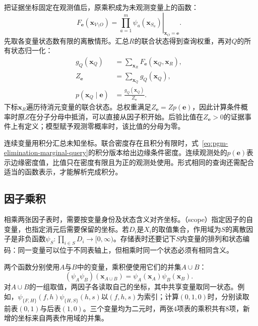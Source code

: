 把证据坐标固定在观测值后，原乘积成为未观测变量上的函数：
\begin{equation}
  F_{\bm{e}}(\bm{x}_{V\setminus O})
  =\left.\prod_{a=1}^{m}\psi_a(\bm{x}_{S_a})
  \right|_{\bm{x}_O=\bm{e}}.
  \label{eq:pgm-elimination-evidence-function}
\end{equation}
先取各变量状态数有限的离散情形。汇总$R$的联合状态得到查询权重，再对$Q$的所有状态归一化：
\begin{equation}
  \begin{aligned}
    g_Q(\bm{x}_Q)
      &=\sum_{\bm{x}_R}F_{\bm{e}}(\bm{x}_Q,\bm{x}_R),\\
    Z_{\bm{e}}&=\sum_{\bm{x}_Q}g_Q(\bm{x}_Q),\\
    p(\bm{x}_Q\mid\bm{e})&=\frac{g_Q(\bm{x}_Q)}{Z_{\bm{e}}}.
  \end{aligned}
  \label{eq:pgm-elimination-marginal-query}
\end{equation}
下标$\bm{x}_R$遍历待消元变量的联合状态。总权重满足$Z_{\bm{e}}=Zp(\bm{e})$，因此计算条件概率时原$Z$在分子分母中抵消，可以直接从因子积开始。后验比值在$Z_{\bm{e}}>0$的证据事件上有定义；模型赋予观测零概率时，该比值的分母为零。

连续变量用积分汇总未知坐标。联合密度存在且积分有限时，式~\eqref{eq:pgm-elimination-marginal-query}的积分版本给出边缘条件密度。连续观测处的$p(\bm{e})$表示边缘密度值，比值只在密度有限且为正的观测处使用。形式相同的查询还需配合适当的函数表示，才能解析完成积分。

\subsection{因子乘积}
\label{sec:pgm-elimination-factor-product}

相乘两张因子表时，需要按变量身份及状态含义对齐坐标。（scope）指定因子的自变量，也指定消元后需要保留的坐标。若$D_i$是$X_i$的取值集合，作用域为$S$的离散因子是非负函数$\psi_S:\prod_{i\in S}D_i\to[0,\infty)$。存储表时还要记下$S$内变量的排列和状态编码：同一变量可以位于不同表轴上，但相乘时同一个状态必须有相同含义。

两个函数分别使用$A$与$B$中的变量，乘积便使用它们的并集$A\cup B$：
\begin{equation}
  (\psi_A\psi_B)(\bm{x}_{A\cup B})
  =\psi_A(\bm{x}_A)\psi_B(\bm{x}_B).
  \label{eq:pgm-elimination-product}
\end{equation}
对$A\cup B$的一组取值，两因子各读取自己的坐标，其中共享变量取同一状态。例如，$\psi_{\{F,H\}}(f,h)\psi_{\{H,S\}}(h,s)$以$(f,h,s)$为索引；计算$(0,1,0)$时，分别读取前表$(0,1)$与后表$(1,0)$。三个变量均为二元时，两张$4$项表的乘积共有$8$项，新增的坐标来自两表作用域的并集。

